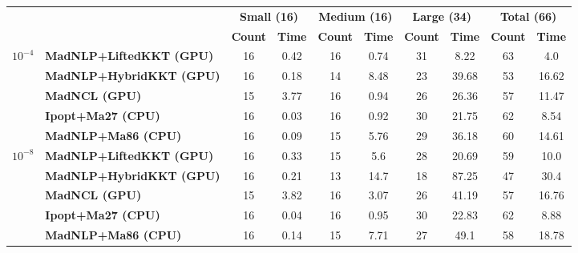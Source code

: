 \begin{center}
\renewcommand{\arraystretch}{0.9}
\begin{tabular}{|l|l|cc|cc|cc|cc|}
\hline
 & & \multicolumn{2}{c|}{\textbf{Small (16)}} & \multicolumn{2}{c|}{\textbf{Medium (16)}} & \multicolumn{2}{c|}{\textbf{Large (34)}} & \multicolumn{2}{c|}{\textbf{Total (66)}} \\
 & & \textbf{Count} & \textbf{Time} & \textbf{Count} & \textbf{Time} & \textbf{Count} & \textbf{Time} & \textbf{Count} & \textbf{Time} \\
\hline
\multirow{5}{*}{\Large\textbf{$10^{-4}$}} & \textbf{MadNLP+LiftedKKT (GPU)} & \cellcolor{blue!15}16 & 0.42 & \cellcolor{blue!15}16 & \cellcolor{blue!15}0.74 & \cellcolor{blue!15}31 & \cellcolor{blue!15}8.22 & \cellcolor{blue!15}63 & \cellcolor{blue!15}4.0 \\
 & \textbf{MadNLP+HybridKKT (GPU)} & \cellcolor{blue!15}16 & 0.18 & 14 & 8.48 & 23 & 39.68 & 53 & 16.62 \\
 & \textbf{MadNCL (GPU)} & 15 & 3.77 & \cellcolor{blue!15}16 & 0.94 & 26 & 26.36 & 57 & 11.47 \\
 & \textbf{Ipopt+Ma27 (CPU)} & \cellcolor{blue!15}16 & \cellcolor{blue!15}0.03 & \cellcolor{blue!15}16 & 0.92 & 30 & 21.75 & 62 & 8.54 \\
 & \textbf{MadNLP+Ma86 (CPU)} & \cellcolor{blue!15}16 & 0.09 & 15 & 5.76 & 29 & 36.18 & 60 & 14.61 \\
\hline
\multirow{5}{*}{\Large\textbf{$10^{-8}$}} & \textbf{MadNLP+LiftedKKT (GPU)} & \cellcolor{blue!15}16 & 0.33 & 15 & 5.6 & 28 & \cellcolor{blue!15}20.69 & 59 & 10.0 \\
 & \textbf{MadNLP+HybridKKT (GPU)} & \cellcolor{blue!15}16 & 0.21 & 13 & 14.7 & 18 & 87.25 & 47 & 30.4 \\
 & \textbf{MadNCL (GPU)} & 15 & 3.82 & \cellcolor{blue!15}16 & 3.07 & 26 & 41.19 & 57 & 16.76 \\
 & \textbf{Ipopt+Ma27 (CPU)} & \cellcolor{blue!15}16 & \cellcolor{blue!15}0.04 & \cellcolor{blue!15}16 & \cellcolor{blue!15}0.95 & \cellcolor{blue!15}30 & 22.83 & \cellcolor{blue!15}62 & \cellcolor{blue!15}8.88 \\
 & \textbf{MadNLP+Ma86 (CPU)} & \cellcolor{blue!15}16 & 0.14 & 15 & 7.71 & 27 & 49.1 & 58 & 18.78 \\
\hline
\end{tabular}
\end{center}
